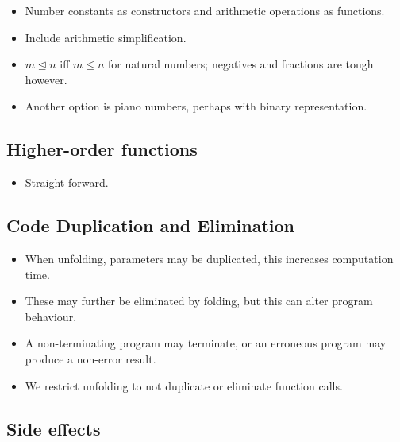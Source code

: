 \begin{itemize}

\item Number constants as constructors and arithmetic operations as functions.

\item Include arithmetic simplification.

\item $m\unlhd n$ iff $m\leq n$ for natural numbers; negatives and fractions
are tough however.

\item Another option is piano numbers, perhaps with binary representation.

\end{itemize}

\subsection{Higher-order functions}

\begin{itemize}

\item Straight-forward.

\end{itemize}

\subsection{Code Duplication and Elimination}

\begin{itemize}

\item When unfolding, parameters may be duplicated, this increases computation
time.

\item These may further be eliminated by folding, but this can alter program
behaviour.

\item A non-terminating program may terminate, or an erroneous program may
produce a non-error result.

\item We restrict unfolding to not duplicate or eliminate function calls.

\end{itemize}

\subsection{Side effects}

